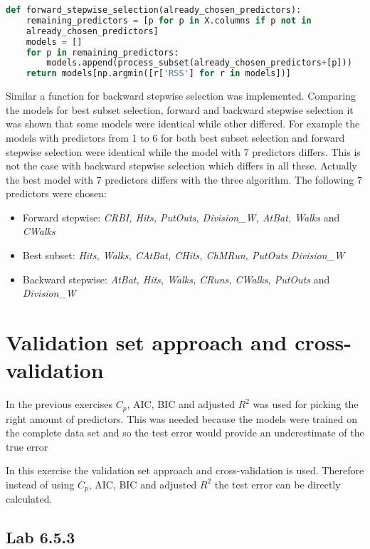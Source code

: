 \begin{lstlisting}[language=Python, label=lst:forwardselection, caption=Function for forward stepwise selection]
def forward_stepwise_selection(already_chosen_predictors):
	remaining_predictors = [p for p in X.columns if p not in
	already_chosen_predictors]
	models = []
	for p in remaining_predictors:
		models.append(process_subset(already_chosen_predictors+[p]))
	return models[np.argmin([r['RSS'] for r in models])]
\end{lstlisting}

Similar a function for backward stepwise selection was implemented. Comparing the models for best subset selection, forward and backward stepwise selection it was shown that some models were identical while other differed. For example the models with predictors from 1 to 6 for both best subset selection and forward stepwise selection were identical while the model with 7 predictors differs. This is not the case with backward stepwise selection which differs in all these. Actually the best model with 7 predictors differs with the three algorithm. The following 7 predictors were chosen:

\begin{itemize}
\item Forward stepwise: \emph{CRBI, Hits, PutOuts, Division\_W, AtBat, Walks} and \emph{CWalks}
\item Best subset: \emph{Hits, Walks, CAtBat, CHits, ChMRun, PutOuts} \emph{Division\_W}
\item Backward stepwise: \emph{AtBat, Hits, Walks, CRuns, CWalks, PutOuts} and \emph{Division\_W}
\end{itemize}

\section{Validation set approach and cross-validation}
In the previous exercises $C_p$, AIC, BIC and adjusted $R^2$ was used for picking the right amount of predictors. This was needed because the models were trained on the complete data set and so the test error would provide an underestimate of the true error

In this exercise the validation set approach and cross-validation is used. Therefore instead of using $C_p$, AIC, BIC and adjusted $R^2$ the test error can be directly calculated. 
\subsection{Lab 6.5.3 }

